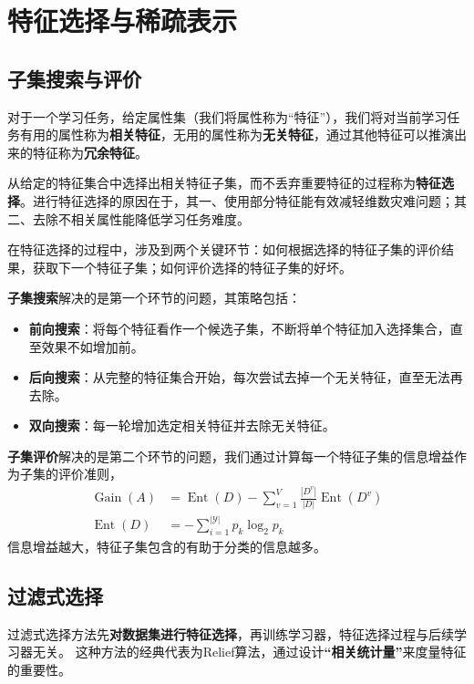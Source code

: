 \chapter{特征选择与稀疏表示}

\section{子集搜索与评价}\label{sec:11.1}
对于一个学习任务，给定属性集（我们将属性称为“特征”），我们将对当前学习任务有用的属性称为\textbf{相关特征}，无用的属性称为\textbf{无关特征}，通过其他特征可以推演出来的特征称为\textbf{冗余特征}。

从给定的特征集合中选择出相关特征子集，而不丢弃重要特征的过程称为\textbf{特征选择}。进行特征选择的原因在于，其一、使用部分特征能有效减轻维数灾难问题；其二、去除不相关属性能降低学习任务难度。

在特征选择的过程中，涉及到两个关键环节：如何根据选择的特征子集的评价结果，获取下一个特征子集；如何评价选择的特征子集的好坏。

\textbf{子集搜索}解决的是第一个环节的问题，其策略包括：
\begin{itemize}
    \item \textbf{前向搜索}：将每个特征看作一个候选子集，不断将单个特征加入选择集合，直至效果不如增加前。
    \item \textbf{后向搜索}：从完整的特征集合开始，每次尝试去掉一个无关特征，直至无法再去除。
    \item \textbf{双向搜索}：每一轮增加选定相关特征并去除无关特征。
\end{itemize}

\textbf{子集评价}解决的是第二个环节的问题，我们通过计算每一个特征子集的信息增益作为子集的评价准则，\[
\begin{aligned}
    \operatorname{Gain}(A) & =\operatorname{Ent}(D)-\sum_{v=1}^{V} \frac{\left|D^{v}\right|}{|D|} \operatorname{Ent}\left(D^{v}\right) \\
    \operatorname{Ent}(D) & = -\sum_{i=1}^{|\mathcal{Y}|} p_k\log_2p_k
\end{aligned}
\]信息增益越大，特征子集包含的有助于分类的信息越多。

\section{过滤式选择}\label{sec:11.2}
过滤式选择方法先\textbf{对数据集进行特征选择}，再训练学习器，特征选择过程与后续学习器无关。
这种方法的经典代表为Relief算法，通过设计\textbf{“相关统计量”}来度量特征的重要性。

